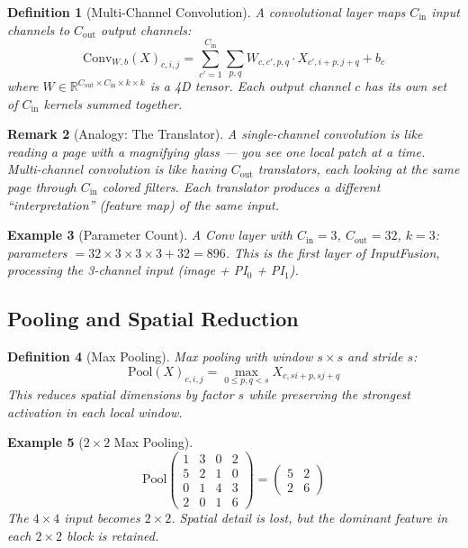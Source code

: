 \documentclass[10pt,twocolumn]{article}
\newtheorem{definition}{Definition}[section]
\newtheorem{remark}[definition]{Remark}
\newtheorem{example}[definition]{Example}
\begin{document}
\begin{definition}[Multi-Channel Convolution]
A convolutional layer maps $C_{\text{in}}$ input channels to $C_{\text{out}}$ output channels:
\begin{equation}
\text{Conv}_{W,b}(X)_{c,i,j} = \sum_{c'=1}^{C_{\text{in}}} \sum_{p,q} W_{c,c',p,q} \cdot X_{c',i+p,j+q} + b_c
\end{equation}
where $W \in \mathbb{R}^{C_{\text{out}} \times C_{\text{in}} \times k \times k}$ is a 4D tensor. Each output channel $c$ has its own set of $C_{\text{in}}$ kernels summed together.
\end{definition}

\begin{remark}[Analogy: The Translator]
A single-channel convolution is like reading a page with a magnifying glass --- you see one local patch at a time. Multi-channel convolution is like having $C_{\text{out}}$ translators, each looking at the same page through $C_{\text{in}}$ colored filters. Each translator produces a different ``interpretation'' (feature map) of the same input.
\end{remark}

\begin{example}[Parameter Count]
A Conv layer with $C_{\text{in}}=3$, $C_{\text{out}}=32$, $k=3$: parameters $= 32 \times 3 \times 3 \times 3 + 32 = 896$. This is the first layer of InputFusion, processing the 3-channel input (image + PI$_0$ + PI$_1$).
\end{example}

\subsection{Pooling and Spatial Reduction}

\begin{definition}[Max Pooling]
Max pooling with window $s \times s$ and stride $s$:
\begin{equation}
\text{Pool}(X)_{c,i,j} = \max_{0 \leq p,q < s} X_{c, si+p, sj+q}
\end{equation}
This reduces spatial dimensions by factor $s$ while preserving the strongest activation in each local window.
\end{definition}

\begin{example}[$2\times2$ Max Pooling]
\[
\text{Pool}\begin{pmatrix} 1 & 3 & 0 & 2 \\ 5 & 2 & 1 & 0 \\ 0 & 1 & 4 & 3 \\ 2 & 0 & 1 & 6 \end{pmatrix} = \begin{pmatrix} 5 & 2 \\ 2 & 6 \end{pmatrix}
\]
The $4\times4$ input becomes $2\times2$. Spatial detail is lost, but the dominant feature in each $2\times2$ block is retained.
\end{example}
\end{document}
